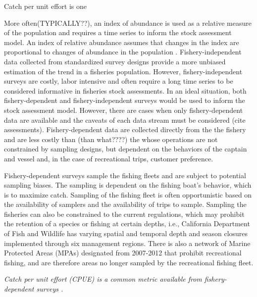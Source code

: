 \documentclass[
  authoryear,
  preprint,
  3p]{elsarticle}
\begin{document}
Catch per unit effort is one

More often(TYPICALLY??), an index of abundance is used as a relative
measure of the population and requires a time series to inform the stock
assessment model. An index of relative abundance assumes that changes in
the index are proportional to changes of abundance in the population
\citep{Harley:2001:CUE}. Fishery-independent data collected from
standardized survey designs provide a more unbiased estimation of the
trend in a fisheries population. However, fishery-independent surveys
are costly, labor intensive and often require a long time series to be
considered informative in fisheries stock assessments. In an ideal
situation, both fishery-dependent and fishery-independent surveys would
be used to inform the stock assessment model. However, there are cases
when only fishery-dependent data are available and the caveats of each
data stream must be considered (cite assessments). Fishery-dependent
data are collected directly from the the fishery and are less costly
than (than what????) the whose operations are not constrained by
sampling designs, but dependent on the behaviors of the captain and
vessel and, in the case of recreational trips, customer preference.

Fishery-dependent surveys sample the fishing fleets and are subject to
potential sampling biases. The sampling is dependent on the fishing
boat's behavior, which is to maximize catch. Sampling of the fishing
fleet is often opportunistic based on the availability of samplers and
the availability of trips to sample. Sampling the fisheries can also be
constrained to the current regulations, which may prohibit the retention
of a species or fishing at certain depths, i.e., California Department
of Fish and Wildlife has varying spatial and temporal depth and season
closures implemented through six management regions. There is also a
network of Marine Protected Areas (MPAs) designated from 2007-2012 that
prohibit recreational fishing, and are therefore areas no longer sampled
by the recreational fishing fleet.

\emph{Catch per unit effort (CPUE) is a common metric available from
fishery-dependent surveys \citep{Maunder:2004:SCE}.}
\end{document}
